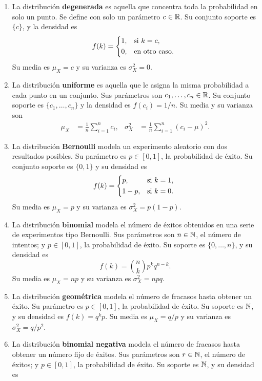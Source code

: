 \begin{enumerate}
	\item La distribución \textbf{degenerada} es aquella que concentra toda la probabilidad en solo un punto. Se define con solo un parámetro \(c \in \mathbb{R}\). Su conjunto soporte es \(\{c\}\), y la densidad es
	\[ f(k) = \begin{dcases*}
		1,	& si \(k = c\),\\
		0,	& en otro caso.
	\end{dcases*} \]
	Su media es \(\mu_X = c\) y su varianza es \(\sigma^2_X = 0\).
	\item La distribución \textbf{uniforme} es aquella que le asigna la misma probabilidad a cada punto en un conjunto. Sus parámetros son \(c_1, \dotsc, c_n \in \mathbb{R}\). Su conjunto soporte es \(\{c_1, \dotsc, c_n\}\) y la densidad es \(f(c_i) = 1 / n\). Su media y su varianza son
	\begin{align*}
		\mu_X		&= \frac{1}{n} \sum_{i=1}^n c_{i},	& \sigma^2_X	&= \frac{1}{n} \sum_{i=1}^n (c_i - \mu)^{2}.
	\end{align*}
	\item La distribución \textbf{Bernoulli} modela un experimento aleatorio con dos resultados posibles. Su parámetro es \(p \in [0, 1]\), la probabilidad de éxito. Su conjunto soporte es \(\{0, 1\}\) y su densidad es
	\[f(k) = \begin{dcases*}
		p,		& si \(k = 1\),\\
		1-p,	& si \(k = 0\).
	\end{dcases*}\]
	Su media es \(\mu_X = p\) y su varianza es \(\sigma^2_X = p (1-p)\).
	\item La distribución \textbf{binomial} modela el número de éxitos obtenidos en una serie de experimentos tipo Bernoulli. Sus parámetros son \(n \in \mathbb{N}\), el número de intentos; y \(p \in [0, 1]\), la probabilidad de éxito. Su soporte es \(\{0, \dotsc, n\}\), y su densidad es
	\[f(k) = \binom{n}{k} p^k q^{n-k}.\]
	Su media es \(\mu_X = np\) y su varianza es \(\sigma^2_X = npq\).
	\item La distribución \textbf{geométrica} modela el número de fracasos hasta obtener un éxito. Su parámetro es \(p \in [0, 1]\), la probabilidad de éxito. Su soporte es \(\mathbb{N}\), y su densidad es \(f(k) = q^{k} p\). Su media es \(\mu_X = q / p\) y su varianza es \(\sigma^2_X = q / p^2\).
	\item La distribución \textbf{binomial negativa} modela el número de fracasos hasta obtener un número fijo de éxitos. Sus parámetros son \(r \in \mathbb{N}\), el número de éxitos; y \(p \in [0, 1]\), la probabilidad de éxito. Su soporte es \(\mathbb{N}\), y su densidad es

\end{enumerate}
